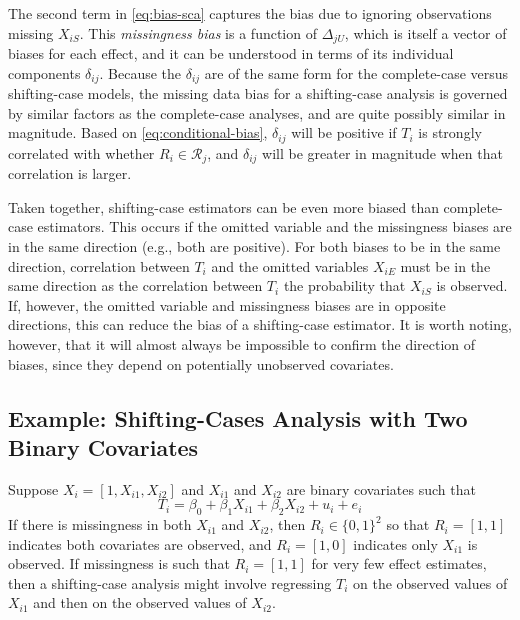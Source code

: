 \documentclass[
]{article}
\begin{document}
The second term in \eqref{eq:bias-sca} captures the bias due to ignoring observations missing \(X_{iS}\).
This \emph{missingness bias} is a function of \(\Delta_{jU}\), which is itself a vector of biases for each effect, and it can be understood in terms of its individual components \(\delta_{ij}\).
Because the \(\delta_{ij}\) are of the same form for the complete-case versus shifting-case models, the missing data bias for a shifting-case analysis is governed by similar factors as the complete-case analyses, and are quite possibly similar in magnitude.
Based on \eqref{eq:conditional-bias}, \(\delta_{ij}\) will be positive if \(T_i\) is strongly correlated with whether \(R_i \in \mathcal{R}_j\), and \(\delta_{ij}\) will be greater in magnitude when that correlation is larger.

Taken together, shifting-case estimators can be even more biased than complete-case estimators.
This occurs if the omitted variable and the missingness biases are in the same direction (e.g., both are positive).
For both biases to be in the same direction, correlation between \(T_i\) and the omitted variables \(X_{iE}\) must be in the same direction as the correlation between \(T_i\) the probability that \(X_{iS}\) is observed.
If, however, the omitted variable and missingness biases are in opposite directions, this can reduce the bias of a shifting-case estimator.
It is worth noting, however, that it will almost always be impossible to confirm the direction of biases, since they depend on potentially unobserved covariates.

\hypertarget{example-shifting-cases-analysis-with-two-binary-covariates}{%
\subsection{Example: Shifting-Cases Analysis with Two Binary Covariates}\label{example-shifting-cases-analysis-with-two-binary-covariates}}

Suppose \(X_i = [1, X_{i1}, X_{i2}]\) and \(X_{i1}\) and \(X_{i2}\) are binary covariates such that
\begin{equation}
T_i = \beta_0 + \beta_1 X_{i1} + \beta_2 X_{i2} + u_i + e_i
\label{eq:sca-ex}
\end{equation}
If there is missingness in both \(X_{i1}\) and \(X_{i2}\), then \(R_i \in \{0, 1\}^2\) so that \(R_i = [1,1]\) indicates both covariates are observed, and \(R_i = [1, 0]\) indicates only \(X_{i1}\) is observed.
If missingness is such that \(R_i = [1, 1]\) for very few effect estimates, then a shifting-case analysis might involve regressing \(T_i\) on the observed values of \(X_{i1}\) and then on the observed values of \(X_{i2}\).
\end{document}
